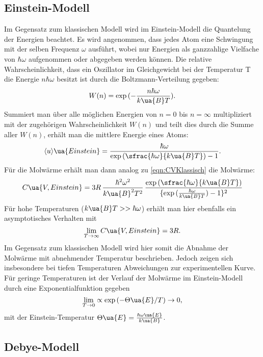 \subsection{Einstein-Modell}

Im Gegensatz zum klassischen Modell wird im Einstein-Modell die Quantelung der Energien
beachtet. Es wird angenommen, dass jedes Atom eine Schwingung mit der selben Frequenz
$\omega$ ausführt, wobei nur Energien als ganzzahlige Vielfache von $\hbar\omega$
aufgenommen oder abgegeben werden können. Die relative Wahrscheinlichkeit, dass ein
Oszillator im Gleichgewicht bei der Temperatur T die Energie $n\hbar\omega$ besitzt
ist durch die Boltzmann-Verteilung gegeben:
\begin{equation}
  W(n) = \exp {(-\frac{n\hbar\omega}{k\ua{B}T})}.
\end{equation}
Summiert man über alle möglichen Energien von $n=0$ bis $n=\infty$ multipliziert
mit der zugehörigen Wahrscheinlichkeit $W(n)$ und teilt dies durch die Summe aller
$W(n)$, erhält man die mittlere Energie eines Atoms:
\begin{equation}
  \langle u \rangle\ua{Einstein} = \frac{\hbar\omega}{\exp{(\sfrac{\hbar\omega}{k\ua{B}T})-1}}.
\end{equation}
Für die Molwärme erhält man dann analog zu \eqref{eqn:CVKlassisch} die Molwärme:
\begin{equation}
  C\ua{V, Einstein} = 3R \,\frac{\hbar^2\omega^2}{k\ua{B}^2T^2} \,\frac{\exp{(\sfrac{\hbar\omega}{k\ua{B}T})}}{\{\exp{(\frac{\hbar\omega}{k\ua{B}T})}-1\}^2}
\end{equation}
Für hohe Temperaturen ($k\ua{B}T>>\hbar\omega$) erhält man hier ebenfalls ein
asymptotisches Verhalten mit
\begin{equation}
  \lim\limits_{T \rightarrow \infty}{C\ua{V,Einstein}} = 3R.
\end{equation}
Im Gegensatz zum klassischen Modell wird hier somit die Abnahme der Molwärme mit
abnehmender Temperatur beschrieben. Jedoch zeigen sich insbesondere bei tiefen
Temperaturen Abweichungen zur experimentellen Kurve.
Für geringe Temperaturen ist der Verlauf der Molwärme im Einstein-Modell durch
eine Exponentialfunktion gegeben
\begin{equation}
  \lim\limits_{T \rightarrow 0} \propto \exp{(-\Theta\ua{E}/T)} \rightarrow 0,
\end{equation}
mit der Einstein-Temperatur $\Theta\ua{E} = \frac{\hbar\omega\ua{E}}{k\ua{B}}$.
\subsection{Debye-Modell}
\label{sec:debye}

